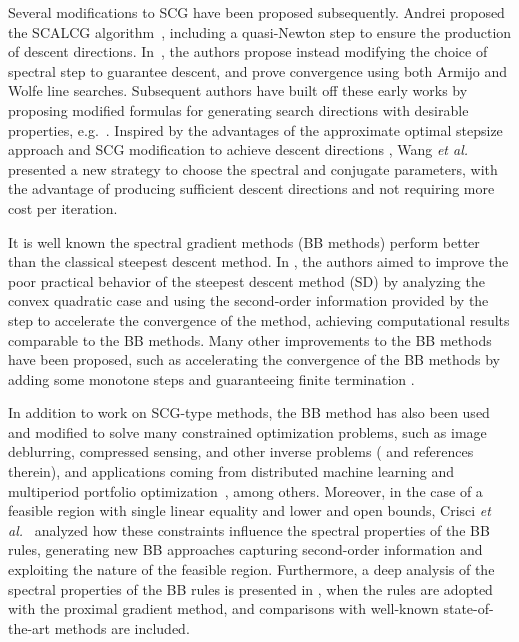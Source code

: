 \documentclass[]{interact}
\theoremstyle{plain}%
\theoremstyle{definition}
\theoremstyle{remark}
\begin{document}
Several modifications to SCG have been proposed subsequently. Andrei proposed the SCALCG algorithm~\cite{andrei07a,andrei07b}, {including a quasi-Newton step to ensure the production of descent directions.} In~\cite{zzl06,dc08}, the authors propose instead modifying the choice of spectral step to guarantee descent, and prove convergence using both Armijo and Wolfe line searches. Subsequent authors have built off these early works by proposing modified formulas for generating search directions with desirable properties, e.g.~\cite{zz08,CL10,andrei2010new,LP12,dwc13,LFZ19}.
Inspired by the advantages of the approximate optimal stepsize approach \cite{LZHL17,LZHL18} and SCG modification to achieve descent directions \cite{Yu08}, Wang {\it et al.}~\cite{wang2020new} presented a new strategy to choose the spectral and conjugate parameters, with the advantage of producing sufficient descent directions and not requiring more cost per iteration.

It is well known the spectral gradient methods (BB methods) perform better than the classical steepest descent method. In \cite{drs056}, the authors aimed to improve the poor practical behavior of the steepest descent method (SD) by analyzing the convex quadratic case and using the second-order information provided by the step to accelerate the convergence of the method, achieving computational results comparable to the BB methods. Many other improvements to the BB methods have been proposed, such as accelerating  the convergence of the BB methods by adding some monotone steps and guaranteeing finite termination \cite{HDLXZ22}.


In addition to work on SCG-type methods, the BB method has also been used and modified to solve many constrained optimization problems, such as image deblurring, compressed sensing, and other inverse problems (\cite{bonettini2008scaled, FMRW07} and references therein), and applications coming from distributed machine learning and multiperiod portfolio optimization~\cite{CDVM23}, among others. Moreover, in the case of a feasible region with single linear equality and lower and open bounds, Crisci {\it et al.}~\cite{CPFVZ20} analyzed how these constraints influence the spectral properties of the BB rules, generating new BB approaches capturing second-order information and exploiting the nature of the feasible region. Furthermore,  a deep analysis of the spectral properties of the BB rules is presented in \cite{Serena23}, when the rules are adopted with the proximal gradient method, and comparisons with well-known state-of-the-art methods are included.
\end{document}
